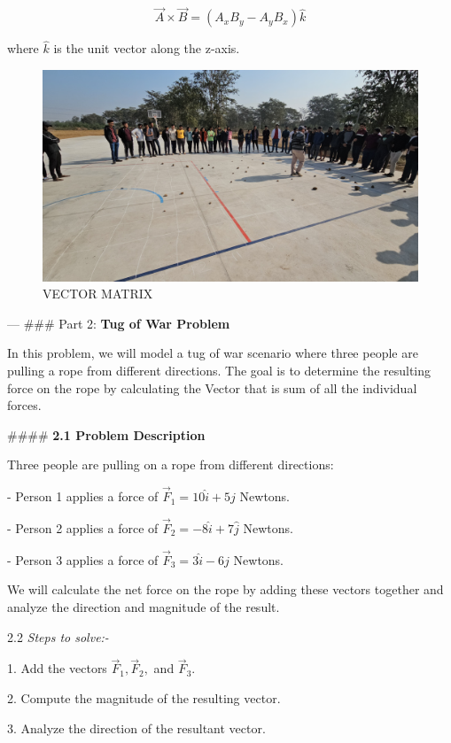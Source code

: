 \documentclass{report}
\begin{document}
\[
\vec{A} \times \vec{B} = (A_x B_y - A_y B_x) \hat{k}
\]

where \(\hat{k}\) is the unit vector along the z-axis.

\begin{figure}
    \centering
    \includegraphics[width=0.7\linewidth]{vector matrix.jpg}
    \caption{VECTOR MATRIX}
    \label{fig:VECTOR MATRIX}
\end{figure}


---
### Part 2: \textbf{Tug of War Problem}


In this problem, we will model a tug of war scenario where three people are pulling a rope from different directions. The goal is to determine the resulting force on the rope by calculating the Vector that is  sum of all the individual forces.

#### \textbf{2.1 Problem Description}

\setlength{\parskip}{1em}

Three people are pulling on a rope from different directions:
\setlength{\parskip}{1em}

- Person 1 applies a force of \( \vec{F}_1 = 10 \hat{i} + 5 \hat{j} \) Newtons.\ 

- Person 2 applies a force of \( \vec{F}_2 = -8 \hat{i} + 7 \hat{j} \) Newtons.\ 

- Person 3 applies a force of \( \vec{F}_3 = 3 \hat{i} - 6 \hat{j} \) Newtons.

We will calculate the net force on the rope by adding these vectors together and analyze the direction and magnitude of the result.

\setlength{\parskip}{1em}

2.2 \textit{Steps to solve:-}

1. Add the vectors \( \vec{F}_1, \vec{F}_2, \) and \( \vec{F}_3 \).\ 

2. Compute the magnitude of the resulting vector. \ 

3. Analyze the direction of the resultant vector.
\end{document}

